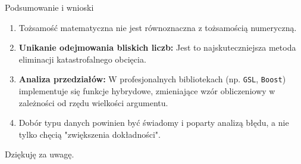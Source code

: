 \documentclass[10pt]{beamer}
\begin{document}
\begin{frame}{Podsumowanie i wnioski}
    \begin{enumerate}
        \item Tożsamość matematyczna nie jest równoznaczna z tożsamością numeryczną.
        \item \textbf{Unikanie odejmowania bliskich liczb:} Jest to najskuteczniejsza metoda eliminacji katastrofalnego obcięcia.
        \item \textbf{Analiza przedziałów:} W profesjonalnych bibliotekach (np. \texttt{GSL}, \texttt{Boost}) implementuje się funkcje hybrydowe, zmieniające wzór obliczeniowy w zależności od rzędu wielkości argumentu.
        \item Dobór typu danych powinien być świadomy i poparty analizą błędu, a nie tylko chęcią "zwiększenia dokładności".
    \end{enumerate}
\end{frame}

\begin{frame}
    \centering
    \Large Dziękuję za uwagę.\\

\end{frame}
\end{document}
